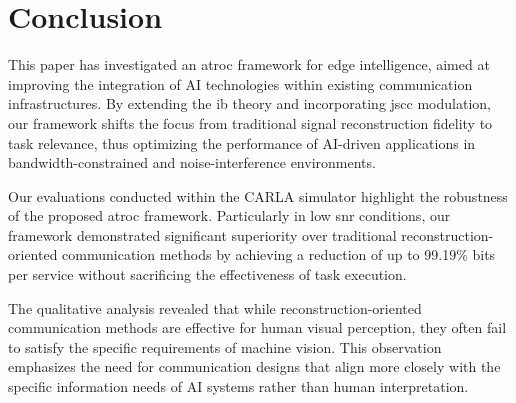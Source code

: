 \section{Conclusion}
\label{sec:conclusion}
This paper has investigated an \gls{atroc} framework for edge intelligence, aimed at improving the integration of AI technologies within existing communication infrastructures. By extending the \gls{ib} theory and incorporating \gls{jscc} modulation, our framework shifts the focus from traditional signal reconstruction fidelity to task relevance, thus optimizing the performance of AI-driven applications in bandwidth-constrained and noise-interference environments.

Our evaluations conducted within the CARLA simulator highlight the robustness of the proposed \gls{atroc} framework. Particularly in low \gls{snr} conditions, our framework demonstrated significant superiority over traditional reconstruction-oriented communication methods by achieving a reduction of up to 99.19\% bits per service without sacrificing the effectiveness of task execution. 

The qualitative analysis revealed that while reconstruction-oriented communication methods are effective for human visual perception, they often fail to satisfy the specific requirements of machine vision. This observation emphasizes the need for communication designs that align more closely with the specific information needs of AI systems rather than human interpretation.
